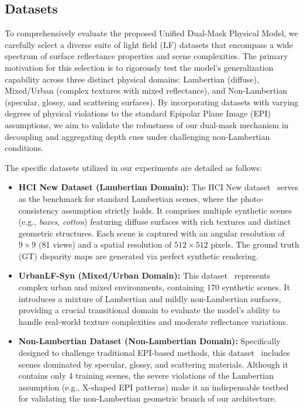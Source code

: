 \documentclass[lettersize,journal]{IEEEtran}
\begin{document}
\subsection{Datasets}
To comprehensively evaluate the proposed Unified Dual-Mask Physical Model, we carefully select a diverse suite of light field (LF) datasets that encompass a wide spectrum of surface reflectance properties and scene complexities. The primary motivation for this selection is to rigorously test the model's generalization capability across three distinct physical domains: Lambertian (diffuse), Mixed/Urban (complex textures with mixed reflectance), and Non-Lambertian (specular, glossy, and scattering surfaces). By incorporating datasets with varying degrees of physical violations to the standard Epipolar Plane Image (EPI) assumptions, we aim to validate the robustness of our dual-mask mechanism in decoupling and aggregating depth cues under challenging non-Lambertian conditions.

The specific datasets utilized in our experiments are detailed as follows:

\begin{itemize}
    \item \textbf{HCI New Dataset (Lambertian Domain):} The HCI New dataset~\cite{honauer2016hci} serves as the benchmark for standard Lambertian scenes, where the photo-consistency assumption strictly holds. It comprises multiple synthetic scenes (e.g., \textit{boxes}, \textit{cotton}) featuring diffuse surfaces with rich textures and distinct geometric structures. Each scene is captured with an angular resolution of $9 \times 9$ (81 views) and a spatial resolution of $512 \times 512$ pixels. The ground truth (GT) disparity maps are generated via perfect synthetic rendering.
    
    \item \textbf{UrbanLF-Syn (Mixed/Urban Domain):} This dataset~\cite{urbanlf2020} represents complex urban and mixed environments, containing 170 synthetic scenes. It introduces a mixture of Lambertian and mildly non-Lambertian surfaces, providing a crucial transitional domain to evaluate the model's ability to handle real-world texture complexities and moderate reflectance variations.
    
    \item \textbf{Non-Lambertian Dataset (Non-Lambertian Domain):} Specifically designed to challenge traditional EPI-based methods, this dataset~\cite{nllf2021} includes scenes dominated by specular, glossy, and scattering materials. Although it contains only 4 training scenes, the severe violations of the Lambertian assumption (e.g., X-shaped EPI patterns) make it an indispensable testbed for validating the non-Lambertian geometric branch of our architecture.
\end{itemize}
\end{document}
